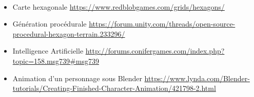 \documentclass[12pt]{report}
\begin{document}
\paragraph{}

\begin{itemize}[label=\textbullet]
\item Carte hexagonale \url{https://www.redblobgames.com/grids/hexagons/}
\item Génération procédurale \url{https://forum.unity.com/threads/open-source-procedural-hexagon-terrain.233296/}
\item Intelligence Artificielle \url{http://forums.conifergames.com/index.php?topic=158.msg739#msg739}
\item Animation d'un personnage sous Blender \url{https://www.lynda.com/Blender-tutorials/Creating-Finished-Character-Animation/421798-2.html}
\end{itemize}
\end{document}
